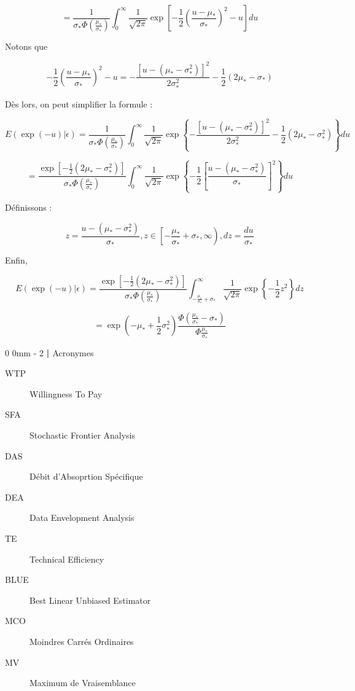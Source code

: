 \documentclass[
  12pt,
]{report}
\makeatletter
\renewcommand{\chapter}{%
    \clearpage %
    \@startsection{chapter}%
    {0} %
    {0mm} %
    {-\baselineskip} %
    {2\baselineskip} %
    {\normalfont\Huge\bfseries | \Huge\bfseries}%
}
\makeatother
\begin{document}
\[
= \frac{1}{\sigma_* \Phi(\frac{\mu_*}{\sigma_*})} \int_{0}^{\infty} \frac{1}{\sqrt{2 \pi}} \exp \left[- \frac{1}{2}\left(\frac{u - \mu_*}{\sigma_*}\right)^2 - u\right]du
\]

Notons que

\[
- \frac{1}{2}\left(\frac{u - \mu_*}{\sigma_*}\right)^2 - u = - \frac{[u - ( \mu_* - \sigma_*^2)]^2}{2 \sigma_*^2} - \frac{1}{2} (2\mu_* - \sigma_*)
\]

Dès lors, on peut simplifier la formule :

\[
E(\exp(-u) | \epsilon) = \frac{1}{\sigma_* \Phi(\frac{\mu_*}{\sigma_*})}  \int_{0}^{\infty} \frac{1}{\sqrt{2 \pi}} \exp \left\{ - \frac{[ u - ( \mu_* - \sigma_*^2)]^2}{2 \sigma_*^2} - \frac{1}{2} (2\mu_* - \sigma_*^2)\right\} du
\]

\[
= \frac{\exp \left[- \frac{1}{2} (2\mu_* - \sigma_*^2) \right]}{\sigma_* \Phi (\frac{\mu_*}{\sigma_*})}  \int_{0}^{\infty} \frac{1}{\sqrt{2 \pi}} \exp \left\{-\frac{1}{2} \left[\frac{u - (\mu_* - \sigma_*^2)}{\sigma_*} \right]^2 \right\}du
\]

Définissons :

\[
z = \frac{u - (\mu_* - \sigma_*^2)}{\sigma_*}, z \in \left[ -\frac{\mu_*}{\sigma_*} + \sigma_*, \infty \right), dz = \frac{du}{\sigma_*}
\]

Enfin,

\[
E(\exp(-u)| \epsilon) = \frac{\exp \left[- \frac{1}{2} (2\mu_* - \sigma_*^2) \right]}{\sigma_* \Phi (\frac{\mu_*}{\sigma_*})} \int_{-\frac{\mu_*}{\sigma_*} + \sigma_*}^{\infty} \frac{1}{\sqrt{2 \pi}} \exp \left\{ - \frac{1}{2} z^2\right\} dz
\]

\[
= \exp \left(-\mu_* + \frac{1}{2} \sigma_*^2 \right) \frac{\Phi \left(\frac{\mu_*}{\sigma_*} - \sigma_* \right)}{\Phi\frac{\mu_*}{\sigma_*}}
\]

\chapter{Acronymes}\label{acronymes}

\begin{description}
\item[WTP]
Willingness To Pay
\item[SFA]
Stochastic Frontier Analysis
\item[DAS]
Débit d'Absoprtion Spécifique
\item[DEA]
Data Envelopment Analysis
\item[TE]
Technical Efficiency
\item[BLUE]
Best Linear Unbiased Estimator
\item[MCO]
Moindres Carrés Ordinaires
\item[MV]
Maximum de Vraisemblance
\end{description}
\end{document}
